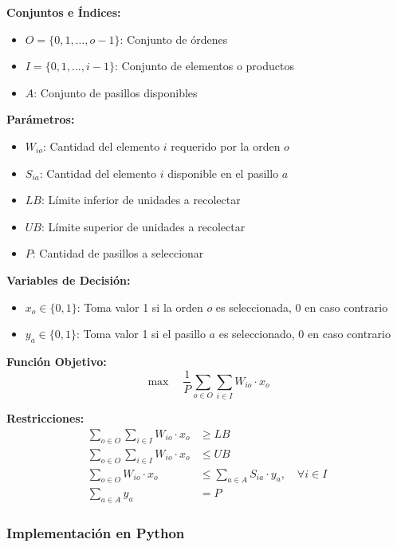 \documentclass[a4paper,12pt]{article}
\begin{document}
\textbf{Conjuntos e Índices:}
\begin{itemize}
    \item $O = \{0, 1, \ldots, o{-}1\}$: Conjunto de órdenes
    \item $I = \{0, 1, \ldots, i{-}1\}$: Conjunto de elementos o productos
    \item $A$: Conjunto de pasillos disponibles
\end{itemize}

\textbf{Parámetros:}
\begin{itemize}
    \item $W_{io}$: Cantidad del elemento $i$ requerido por la orden $o$
    \item $S_{ia}$: Cantidad del elemento $i$ disponible en el pasillo $a$
    \item $LB$: Límite inferior de unidades a recolectar
    \item $UB$: Límite superior de unidades a recolectar
    \item $P$: Cantidad de pasillos a seleccionar
\end{itemize}

\textbf{Variables de Decisión:}
\begin{itemize}
    \item $x_o \in \{0,1\}$: Toma valor 1 si la orden $o$ es seleccionada, 0 en caso contrario
    \item $y_a \in \{0,1\}$: Toma valor 1 si el pasillo $a$ es seleccionado, 0 en caso contrario
\end{itemize}

\textbf{Función Objetivo:}
\begin{equation}
\max \quad \frac{1}{P} \sum_{o \in O} \sum_{i \in I} W_{io} \cdot x_o
\end{equation}

\textbf{Restricciones:}
\begin{align}
\sum_{o \in O} \sum_{i \in I} W_{io} \cdot x_o &\geq LB \label{eq:limite_inferior} \\[6pt]
\sum_{o \in O} \sum_{i \in I} W_{io} \cdot x_o &\leq UB \label{eq:limite_superior} \\[6pt]
\sum_{o \in O} W_{io} \cdot x_o &\leq \sum_{a \in A} S_{ia} \cdot y_a, \quad \forall i \in I \label{eq:disponibilidad} \\[6pt]
\sum_{a \in A} y_a &= P \label{eq:pasillos_fijos}
\end{align}

\subsubsection{Implementación en Python}
\end{document}
